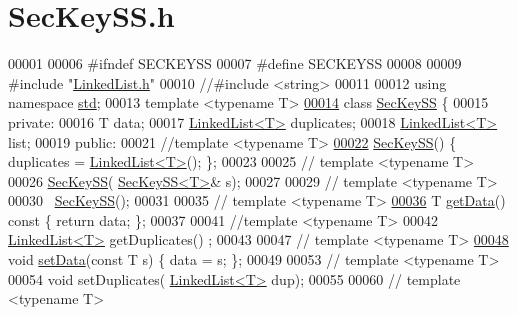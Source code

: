 \hypertarget{SecKeySS_8h_source}{}\section{Sec\+Key\+S\+S.\+h}

\begin{DoxyCode}
00001 
00006 \textcolor{preprocessor}{#ifndef SECKEYSS}
00007 \textcolor{preprocessor}{#define SECKEYSS}
00008 
00009 \textcolor{preprocessor}{#include "\hyperlink{LinkedList_8h}{LinkedList.h}"}
00010 \textcolor{comment}{//#include <string>}
00011 
00012 \textcolor{keyword}{using namespace }\hyperlink{namespacestd}{std};
00013 \textcolor{keyword}{template} <\textcolor{keyword}{typename} T>
\hyperlink{classSecKeySS}{00014} \textcolor{keyword}{class }\hyperlink{classSecKeySS}{SecKeySS} \{
00015 \textcolor{keyword}{private}:
00016     T data;
00017     \hyperlink{classLinkedList}{LinkedList<T>} duplicates;
00018     \hyperlink{classLinkedList}{LinkedList<T>} list;
00019 \textcolor{keyword}{public}:
00021     \textcolor{comment}{//template <typename T>}
\hyperlink{classSecKeySS_a9f905dffce0987d620cb2883b3f774cc}{00022}     \hyperlink{classSecKeySS_a9f905dffce0987d620cb2883b3f774cc}{SecKeySS}() \{ duplicates = \hyperlink{classLinkedList}{LinkedList<T>}(); \};
00023     
00025 \textcolor{comment}{//  template <typename T>}
00026     \hyperlink{classSecKeySS}{SecKeySS}( \hyperlink{classSecKeySS}{SecKeySS<T>}& s);
00027 
00029 \textcolor{comment}{//  template <typename T>}
00030     ~\hyperlink{classSecKeySS}{SecKeySS}();
00031 
00035 \textcolor{comment}{//  template <typename T>}
\hyperlink{classSecKeySS_a9fdb8a771250b7aaab556f019b381eab}{00036}     T \hyperlink{classSecKeySS_a9fdb8a771250b7aaab556f019b381eab}{getData}()\textcolor{keyword}{ const }\{ \textcolor{keywordflow}{return} data; \};
00037 
00041     \textcolor{comment}{//template <typename T>}
00042     \hyperlink{classLinkedList}{LinkedList<T>} getDuplicates() ;
00043 
00047 \textcolor{comment}{//  template <typename T>}
\hyperlink{classSecKeySS_ae893fbaf619bf61f73f1585ae5686609}{00048}     \textcolor{keywordtype}{void} \hyperlink{classSecKeySS_ae893fbaf619bf61f73f1585ae5686609}{setData}(\textcolor{keyword}{const} T s) \{ data = s; \};
00049 
00053 \textcolor{comment}{//  template <typename T>}
00054     \textcolor{keywordtype}{void} setDuplicates( \hyperlink{classLinkedList}{LinkedList<T>} dup);
00055 
00060 \textcolor{comment}{//  template <typename T>}

\end{DoxyCode}
